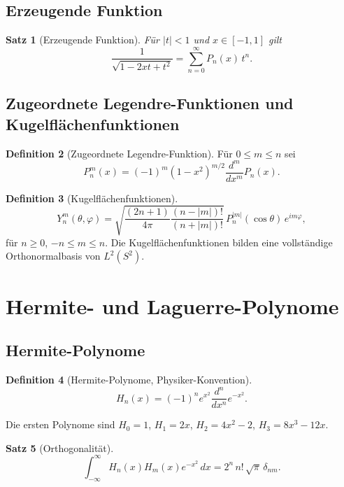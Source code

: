 \documentclass[12pt,a4paper]{amsart}
\newtheorem{theorem}{Satz}[section]
\theoremstyle{definition}
\newtheorem{definition}[theorem]{Definition}
\begin{document}
\subsection{Erzeugende Funktion}

\begin{theorem}[Erzeugende Funktion]
Für \(|t| < 1\) und \(x \in [-1,1]\) gilt
\[
  \frac{1}{\sqrt{1-2xt+t^2}} = \sum_{n=0}^\infty P_n(x)\,t^n.
\]
\end{theorem}

\subsection{Zugeordnete Legendre-Funktionen und Kugelflächenfunktionen}

\begin{definition}[Zugeordnete Legendre-Funktion]
Für \(0 \leq m \leq n\) sei
\[
  P_n^m(x) = (-1)^m(1-x^2)^{m/2}\frac{d^m}{dx^m}P_n(x).
\]
\end{definition}

\begin{definition}[Kugelflächenfunktionen]
\[
  Y_n^m(\theta,\varphi)
  = \sqrt{\frac{(2n+1)}{4\pi}\frac{(n-|m|)!}{(n+|m|)!}}\,
  P_n^{|m|}(\cos\theta)\,e^{im\varphi},
\]
für \(n \geq 0\), \(-n \leq m \leq n\).  Die Kugelflächenfunktionen bilden eine
vollständige Orthonormalbasis von \(L^2(S^2)\).
\end{definition}

\section{Hermite- und Laguerre-Polynome}
\label{sec:hermite_laguerre}

\subsection{Hermite-Polynome}

\begin{definition}[Hermite-Polynome, Physiker-Konvention]
\[
  H_n(x) = (-1)^n e^{x^2}\frac{d^n}{dx^n}e^{-x^2}.
\]
\end{definition}

Die ersten Polynome sind \(H_0 = 1\), \(H_1 = 2x\), \(H_2 = 4x^2-2\), \(H_3 = 8x^3-12x\).

\begin{theorem}[Orthogonalität]
\[
  \int_{-\infty}^\infty H_n(x)H_m(x)e^{-x^2}\,dx = 2^n\,n!\,\sqrt{\pi}\,\delta_{nm}.
\]
\end{theorem}
\end{document}
